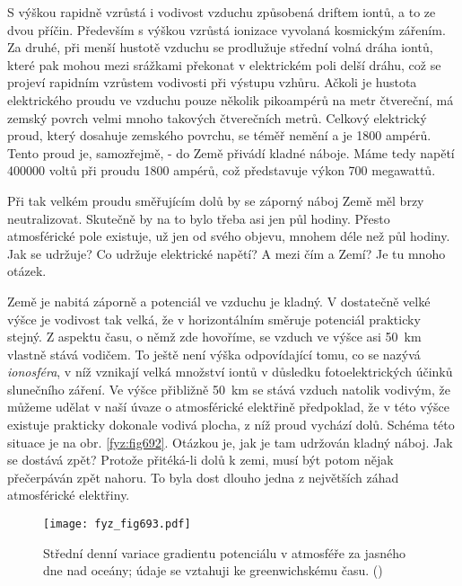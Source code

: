     S výškou rapidně vzrůstá i vodivost vzduchu způsobená driftem iontů, a to ze dvou příčin. 
    Především s výškou vzrůstá ionizace vyvolaná kosmickým zářením. Za druhé, při menší hustotě
    vzduchu se prodlužuje střední volná dráha iontů, které pak mohou mezi srážkami překonat v
    elektrickém poli delší dráhu, což se projeví rapidním vzrůstem vodivosti při výstupu vzhůru.
    Ačkoli je hustota elektrického proudu ve vzduchu pouze několik pikoampérů na metr čtvereční, má
    zemský povrch velmi mnoho takových čtverečních metrů. Celkový elektrický proud, který dosahuje
    zemského povrchu, se téměř nemění a je 1800 ampérů. Tento proud je, samozřejmě,  - do
    Země přivádí kladné náboje. Máme tedy napětí \num{400 000} voltů při proudu \num{1800} ampérů,
    což představuje výkon \num{700} megawattů.

    Při tak velkém proudu směřujícím dolů by se záporný náboj Země měl brzy neutralizovat. Skutečně
    by na to bylo třeba asi jen půl hodiny. Přesto atmosférické pole existuje, už jen od svého
    objevu, mnohem déle než půl hodiny. Jak se udržuje? Co udržuje elektrické napětí? A mezi čím a
    Zemí? Je tu mnoho otázek. 

    Země je nabitá záporně a potenciál ve vzduchu je kladný. V dostatečně velké výšce je vodivost
    tak velká, že v horizontálním směruje potenciál prakticky stejný. Z aspektu času, o němž zde
    hovoříme, se vzduch ve výšce asi \SI{50}{\km} vlastně stává vodičem. To ještě není výška
    odpovídající tomu, co se nazývá \emph{ionosféra}, v níž vznikají velká množství iontů v důsledku
    fotoelektrických účinků slunečního záření. Ve výšce přibližně \SI{50}{\km} se stává vzduch
    natolik vodivým, že můžeme udělat v naší úvaze o atmosférické elektřině předpoklad, že v této
    výšce existuje prakticky dokonale vodivá plocha, z níž proud vychází dolů. Schéma této situace
    je na obr. \ref{fyz:fig692}. Otázkou je, jak je tam udržován kladný náboj. Jak se dostává zpět?
    Protože přitéká-li dolů k zemi, musí být potom nějak přečerpáván zpět nahoru. To byla dost
    dlouho jedna z největších záhad atmosférické elektřiny.

    \begin{figure}[ht!] %
      \centering
      \texttt{[image: fyz\_fig693.pdf]}
      \caption{Střední denní variace gradientu potenciálu v atmosféře za jasného dne nad oceány;
               údaje se vztahuji ke greenwichskému času. (\cite[s.~707]{Feynman02})}
      \label{fyz:fig693}
    \end{figure}

